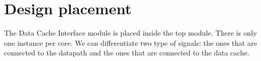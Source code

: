 \section{Design placement}
\label{chapter2}

The Data Cache Interface module is placed inside the top module.
There is only one instance per core.
We can differentiate two type of signals: the ones that are connected to the datapath and the ones that are connected to the data cache.
